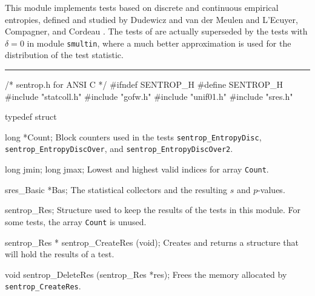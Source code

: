 
This module implements tests based on discrete and continuous 
empirical entropies, defined and studied by
Dudewicz and van der Meulen  \cite{rDUD81b,rDUD95a}
and L'Ecuyer, Compagner, and Cordeau \cite{rLEC96e}.
The tests of \cite{rDUD81b,rDUD95a} are actually superseded by the 
tests with $\delta=0$ in module {\tt smultin}, where a much better
approximation is used for the distribution of the test statistic.
 \resdef


\bigskip\hrule
\code\hide
/* sentrop.h  for ANSI C */
#ifndef SENTROP_H
#define SENTROP_H
\endhide
#include "statcoll.h"
#include "gofw.h"
#include "unif01.h"
#include "sres.h"
\endcode


\ifdetailed  %

\code

typedef struct {

   long *Count;
\endcode
\tabb
   Block counters used in the tests  {\tt sentrop\_EntropyDisc}, 
  {\tt sentrop\_EntropyDiscOver}, and {\tt sentrop\_EntropyDiscOver2}.
\endtabb
\code

   long jmin;
   long jmax;
\endcode
\tabb
  Lowest and highest valid indices for array {\tt Count}.
\endtabb
\code

   sres_Basic *Bas;
\endcode
 \tabb
  The statistical collectors and the resulting $s$ and $p$-values.
 \endtabb
\code

} sentrop_Res;
\endcode
 \tab
  Structure used to keep the results of the tests in this module.
  For some tests, the array {\tt Count} is unused.
 \endtab
\code


sentrop_Res * sentrop_CreateRes (void);
\endcode
 \tab 
  Creates and returns a structure that will hold the results of a test.
 \endtab
\code


void sentrop_DeleteRes (sentrop_Res *res);
\endcode
 \tab 
  Frees the memory allocated by {\tt sentrop\_CreateRes}.
 \endtab
\fi   %



\code

